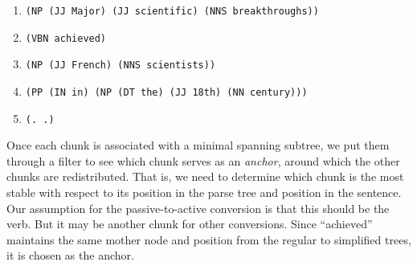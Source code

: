 \documentclass[a4paper,11pt]{article}
\begin{document}
\begin{enumerate}\itemsep 1pt
  \item \begin{verbatim}(NP (JJ Major) (JJ scientific) (NNS breakthroughs))\end{verbatim}
  \item \begin{verbatim}(VBN achieved)\end{verbatim}
  \item \begin{verbatim}(NP (JJ French) (NNS scientists))\end{verbatim}
  \item \begin{verbatim}(PP (IN in) (NP (DT the) (JJ 18th) (NN century)))\end{verbatim}
  \item \begin{verbatim}(. .)\end{verbatim}
\end{enumerate}


Once each chunk is associated with a minimal spanning subtree, we put them through a filter to see which chunk serves as an \textit{anchor}, around which the other chunks are redistributed.  That is, we need to determine which chunk is the most stable with respect to its position in the parse tree  and position in the sentence. Our assumption for the passive-to-active conversion is that this should be the verb. But it may be another chunk for other conversions. Since ``achieved'' maintains the same mother node and position from the regular to simplified trees, it is chosen as the anchor. 
\end{document}
